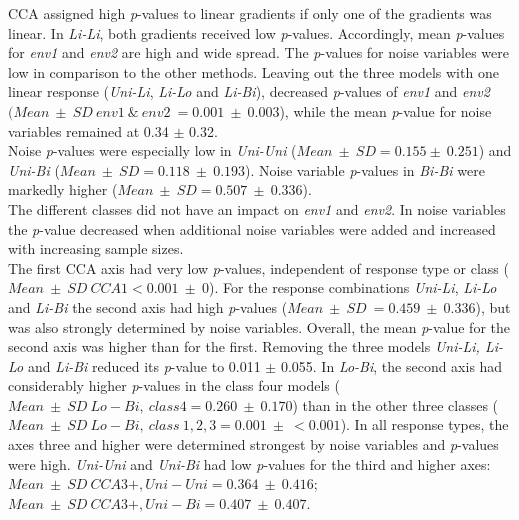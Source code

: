 		CCA assigned high \textit{p}-values to linear gradients if only one of the gradients was linear.
		In \textit{Li-Li}, both gradients received low \textit{p}-values.
		Accordingly, mean \textit{p}-values for \textit{env1} and \textit{env2} are high and wide spread. 
		The \textit{p}-values for noise variables were low in comparison to the other methods.
		Leaving out the three models with one linear response (\textit{Uni-Li}, \textit{Li-Lo} and \textit{Li-Bi}), decreased \textit{p}-values of \textit{env1} and \textit{env2} $(Mean\ \pm\ SD\ \scriptscriptstyle env1\ \&\  env2\ \textstyle = 0.001\ \pm\ 0.003$), while the mean \textit{p}-value for noise variables remained at 0.34 $\pm$ 0.32.\\
		Noise \textit{p}-values were especially low in \textit{Uni-Uni} ($Mean\ \pm\ SD = 0.155 \pm\ 0.251$) and \textit{Uni-Bi} ($Mean\ \pm\ SD = 0.118\ \pm\ 0.193$). 
		Noise variable \textit{p}-values in \textit{Bi-Bi} were markedly higher ($Mean\ \pm\ SD = 0.507\ \pm\ 0.336$). \\
		The different classes did not have an impact on \textit{env1} and \textit{env2}. 
		In noise variables the \textit{p}-value decreased when additional noise variables were added and increased with increasing sample sizes. \\
	
		The first CCA axis had very low \textit{p}-values, independent of response type or class ($Mean\ \pm\ SD\ \scriptscriptstyle CCA1 \textstyle < 0.001\ \pm\ 0$). 
		For the response combinations \textit{Uni-Li}, \textit{Li-Lo} and \textit{Li-Bi} the second axis had high \textit{p}-values ($Mean\ \pm\ SD\ =  0.459\ \pm\ 0.336$), but was also strongly determined by noise variables.
		Overall, the mean \textit{p}-value for the second axis was higher than for the first.
		Removing the three models \textit{Uni-Li, Li-Lo} and \textit{Li-Bi} reduced its \textit{p}-value to 0.011 $\pm$ 0.055. 
		In \textit{Lo-Bi}, the second axis had considerably higher \textit{p}-values in the class four models 
		($Mean\ \pm\ SD\ \scriptscriptstyle Lo-Bi,\ class 4 \textstyle = 0.260\ \pm\ 0.170$)
		than in the other three classes  
		($Mean\ \pm\ SD\ \scriptscriptstyle Lo-Bi,\ class\ 1,2,3 \textstyle = 0.001\ \pm\ < 0.001$). 
		In all response types, the axes three and higher were determined strongest by noise variables and \textit{p}-values were high. 
		\textit{Uni-Uni} and \textit{Uni-Bi} had low \textit{p}-values for the third and higher axes: 
		$Mean\ \pm\ SD\ \scriptscriptstyle CCA3+, Uni-Uni \textstyle = 0.364\ \pm\ 0.416$;
		$Mean\ \pm\ SD\ \scriptscriptstyle CCA3+, Uni-Bi  \textstyle = 0.407\ \pm\ 0.407$.\\
		
